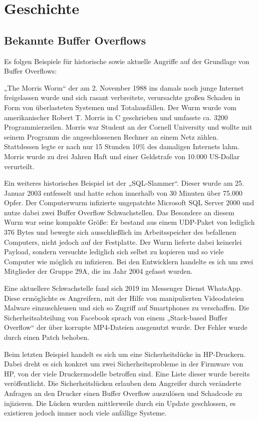 \section{Geschichte}
\subsection{Bekannte Buffer Overflows} \label{sec:wellknown}
Es folgen Beispiele für historische sowie aktuelle Angriffe auf der Grundlage von Buffer Overflows:

„The Morris Worm“ der am 2. November 1988 ins damals noch junge Internet freigelassen wurde und sich rasant verbreitete,
verursachte großen Schaden in Form von überlasteten Systemen und Totalausfällen. Der Wurm wurde vom amerikanischer Robert T. Morris in C geschrieben
und umfasste ca. 3200 Programmierzeilen. Morris war Student an der Cornell University und wollte mit seinem Programm die angeschlossenen Rechner an einem Netz zählen.
Stattdessen legte er nach nur 15 Stunden 10\% des damaligen Internets lahm. Morris wurde zu drei Jahren Haft und einer Geldstrafe von 10.000 US-Dollar verurteilt. \cite{wiki1}

Ein weiteres historisches Beispiel ist der „SQL-Slammer“. Dieser wurde am 25. Januar 2003 entfesselt und hatte schon innerhalb von 30 Minuten über 75.000 Opfer.
Der Computerwurm infizierte ungepatchte Microsoft SQL Server 2000 und nutze dabei zwei Buffer Overflow Schwachstellen.
Das Besondere an diesem Wurm war seine kompakte Größe: Er bestand aus einem UDP-Paket von lediglich 376 Bytes und bewegte sich ausschließlich im Arbeitsspeicher des befallenen
Computers, nicht jedoch auf der Festplatte. Der Wurm lieferte dabei keinerlei Payload, sondern versuchte lediglich sich selbst zu kopieren und
so viele Computer wie möglich zu infizieren. Bei den Entwicklern handelte es ich um zwei Mitglieder der Gruppe 29A, die im Jahr 2004 gefasst wurden. \cite{wiki2}

Eine aktuellere Schwachstelle fand sich 2019 im Messenger Dienst WhatsApp. Diese ermöglichte es Angreifern,
mit der Hilfe von manipulierten Videodateien Malware einzuschleusen und sich so Zugriff auf Smartphones zu verschaffen.
Die Sicherheitsabteilung von Facebook sprach von einem „Stack-based Buffer Overflow“ der über korrupte MP4-Dateien ausgenutzt wurde.
Der Fehler wurde durch einen Patch behoben. \cite{whatsapp1}

Beim letzten Beispiel handelt es sich um eine Sicherheitslücke in HP-Druckern.
Dabei dreht es sich konkret um zwei Sicherheitsprobleme in der Firmware von HP, von der viele Druckermodelle betroffen sind.
Eine Liste dieser wurde bereits veröffentlicht. Die Sicherheitslücken erlauben dem Angreifer durch veränderte Anfragen an den Drucker einen Buffer Overflow auszulösen
und Schadcode zu injizieren. Die Lücken wurden mittlerweile durch ein Update geschlossen, es existieren jedoch immer noch viele anfällige Systeme. \cite{hpvuln}
